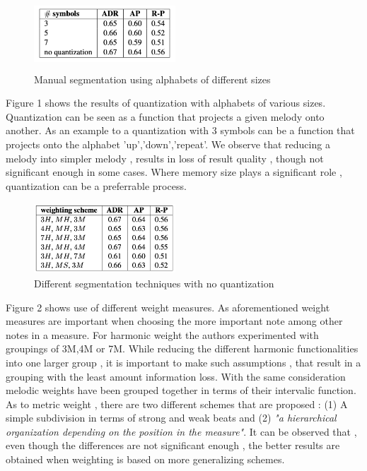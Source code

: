 \documentclass{llncs}
\begin{document}
			\begin{figure}[h!]
			\centering
			\includegraphics[width=200px,height=100px,keepaspectratio]{one_of_two_point_four}
			\caption{Manual segmentation using alphabets of different sizes \cite{two_point_four}}
			\end{figure}


			Figure 1 shows the results of quantization with alphabets of various sizes. Quantization can be seen as a function that projects a given melody onto another. As an example to a quantization with 3 symbols can be a function that projects onto the alphabet {'up','down','repeat'}. We observe that reducing a melody into simpler melody , results in loss of result quality , though not significant enough in some cases. Where memory size plays a significant role , quantization can be a preferrable process.   

			\begin{figure}[h!]
			\centering
			\includegraphics[width=200px,height=100px,keepaspectratio]{three_of_two_point_four}
			\caption{Different segmentation techniques with no quantization \cite{two_point_four}}
			\end{figure}

			Figure 2 shows use of different weight measures. As aforementioned weight measures are important when choosing the more important note among other notes in a measure. For harmonic weight the authors experimented with groupings of 3M,4M or 7M. While reducing the different harmonic functionalities into one larger group , it is important to make such assumptions , that result in a grouping with the least amount information loss. With the same consideration melodic weights have been grouped together in terms of their intervalic function. As to metric weight , there are two different schemes that are proposed : (1) A simple subdivision in terms of strong and weak beats and (2) \textit{"a hierarchical organization depending on the position in the measure"}. It can be observed that , even though the differences are not significant enough , the better results are obtained when weighting is based on more generalizing schemes.
\end{document}
